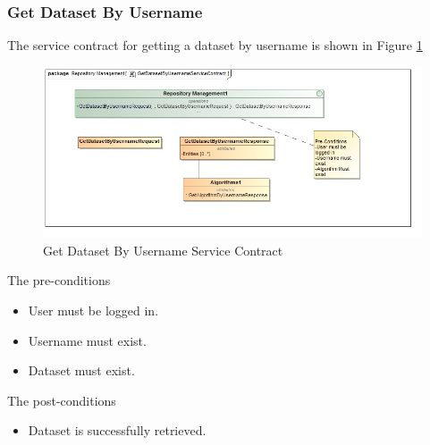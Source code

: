 \subsubsection{Get Dataset By Username}
The service contract for getting a dataset by username is shown in Figure \ref{fig:getDatasetByUsername}
\begin{figure}[H]
  \begin{center}
    \includegraphics[scale=0.6]{../Diagrams and Charts/Test Data/GetDatasetByUsernameServiceContract.jpg}
    \caption{Get Dataset By Username Service Contract}
    \label{fig:getDatasetByUsername}
  \end{center}
  
\end{figure}  

The pre-conditions
\begin{itemize}
  \item User must be logged in.
  \item Username must exist.
  \item Dataset must exist.
\end{itemize}

The post-conditions
\begin{itemize}
  \item Dataset is successfully retrieved.
\end{itemize}

